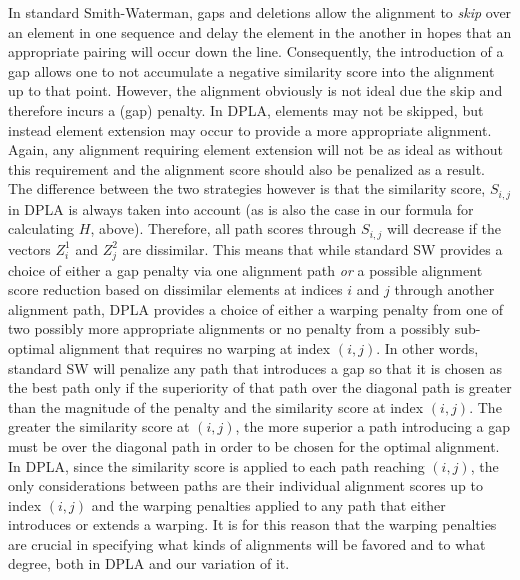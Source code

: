 \documentclass[a4paper,12pt]{report} 	%
\numberwithin{figure}{chapter}
\numberwithin{table}{chapter}
\numberwithin{equation}{chapter}
\begin{document}
\begin{flushleft}
In standard Smith-Waterman, gaps and deletions allow the alignment to \emph{skip} over an element in one sequence and delay the element in the another in hopes that an appropriate pairing will occur down the line. Consequently, the introduction of a gap allows one to not accumulate a negative similarity score into the alignment up to that point. However, the alignment obviously is not ideal due the skip and therefore incurs a (gap) penalty. In DPLA, elements may not be skipped, but instead element extension may occur to provide a more appropriate alignment. Again, any alignment requiring element extension will not be as ideal as without this requirement and the alignment score should also be penalized as a result. The difference between the two strategies however is that the similarity score, $S_{i,j}$ in DPLA is always taken into account (as is also the case in our formula for calculating $H$, above). Therefore, all path scores through $S_{i,j}$ will decrease if the vectors $Z_i^1$ and $Z_j^2$ are dissimilar. This means that while standard SW provides a choice of either a gap penalty via one alignment path \textit{or} a possible alignment score reduction based on dissimilar elements at indices $i$ and $j$ through another alignment path, DPLA provides a choice of either a warping penalty from one of two possibly more appropriate alignments or no penalty from a possibly sub-optimal alignment that requires no warping at index $(i,j)$. In other words, standard SW will penalize any path that introduces a gap so that it is chosen as the best path only if the superiority of that path over the diagonal path is greater than the magnitude of the penalty and the similarity score at index $(i,j)$. The greater the similarity score at $(i,j)$, the more superior a path introducing a gap must be over the diagonal path in order to be chosen for the optimal alignment. In DPLA, since the similarity score is applied to each path reaching $(i,j)$, the only considerations between paths are their individual alignment scores up to index $(i,j)$ and the warping penalties applied to any path that either introduces or extends a warping. It is for this reason that the warping penalties are crucial in specifying what kinds of alignments will be favored and to what degree, both in DPLA and our variation of it.


\end{flushleft}
\end{document}
